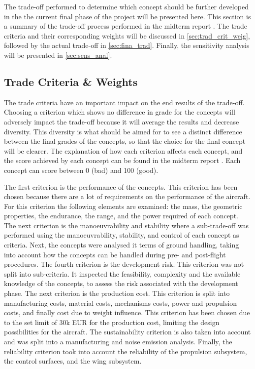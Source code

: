 The trade-off performed to determine which concept should be further developed in the the current final phase of the project will be presented here. This section is a summary of the trade-off process performed in the midterm report \cite{midterm}. The trade criteria and their corresponding weights will be discussed in \autoref{sec:trad_crit_weig}, followed by the actual trade-off in \autoref{sec:fina_trad}. Finally, the sensitivity analysis will be presented in \autoref{sec:sens_anal}.

\subsection{Trade Criteria \& Weights}
\label{sec:trad_crit_weig}

The trade criteria have an important impact on the end results of the trade-off. Choosing a criterion which shows no difference in grade for the concepts will adversely impact the trade-off because it will average the results and decrease diversity. This diversity is what should be aimed for to see a distinct difference between the final grades of the concepts, so that the choice for the final concept will be clearer. The explanation of how each criterion affects each concept, and the score achieved by each concept can be found in the midterm report \cite{midterm}. Each concept can score between 0 (bad) and 100 (good).

The first criterion is the performance of the concepts. This criterion has been chosen because there are a lot of requirements on the performance of the aircraft. For this criterion the following elements are examined: the mass, the geometric properties, the endurance, the range, and the power required of each concept. The next criterion is the manoeuvrability and stability where a sub-trade-off was performed using the manoeuvrability, stability, and control of each concept as criteria. Next, the concepts were analysed it terms of ground handling, taking into account how the concepts can be handled during pre- and post-flight procedures. The fourth criterion is the development risk. This criterion was not split into sub-criteria. It inspected the feasibility, complexity and the available knowledge of the concepts, to assess the risk associated with the development phase. The next criterion is the production cost. This criterion is split into manufacturing costs, material costs, mechanisms costs, power and propulsion costs, and finally cost due to weight influence. This criterion has been chosen due to the set limit of 30k EUR for the production cost, limiting the design possibilities for the aircraft. The sustainability criterion is also taken into account and was split into a manufacturing and noise emission analysis. Finally, the reliability criterion took into account the reliability of the propulsion subsystem, the control surfaces, and the wing subsystem.

